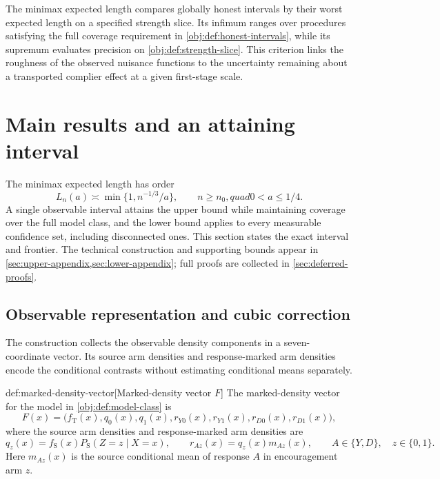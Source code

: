 \documentclass[11pt]{article}
\begin{document}
The minimax expected length  compares globally honest intervals by their worst expected length on a specified strength slice. Its infimum ranges over procedures satisfying the full coverage requirement in \cref{obj:def:honest-intervals}, while its supremum evaluates precision on \cref{obj:def:strength-slice}. This criterion links the roughness of the observed nuisance functions to the uncertainty remaining about a transported complier effect at a given first-stage scale.


\section{Main results and an attaining interval}
\label{sec:main-results}

The minimax expected length has order
\[
L_n(a)\asymp \min\{1,n^{-1/3}/a\},
\qquad n\ge n_0,quad 0<a\le 1/4.
\]
A single observable interval attains the upper bound while maintaining coverage over the full model class, and the lower bound applies to every measurable confidence set, including disconnected ones. This section states the exact interval and frontier. The technical construction and supporting bounds appear in \cref{sec:upper-appendix,sec:lower-appendix}; full proofs are collected in \cref{sec:deferred-proofs}.

\subsection{Observable representation and cubic correction}

The construction collects the observable density components in a seven-coordinate vector. Its source arm densities and response-marked arm densities encode the conditional contrasts without estimating conditional means separately.

\begin{definitionv}{def:marked-density-vector}[Marked-density vector \(F\)]
The marked-density vector for the model in \cref{obj:def:model-class} is
\[
F(x)=\bigl(f_{\mathrm T}(x),q_0(x),q_1(x),
r_{Y0}(x),r_{Y1}(x),r_{D0}(x),r_{D1}(x)\bigr),
\]
where the source arm densities and response-marked arm densities are
\[
q_z(x)=f_{\mathrm S}(x)P_{\mathrm S}(Z=z\mid X=x),
\qquad
r_{Az}(x)=q_z(x)m_{Az}(x),
\qquad A\in\{Y,D\},\quad z\in\{0,1\}.
\]
Here \(m_{Az}(x)\) is the source conditional mean of response \(A\) in encouragement arm \(z\).
\end{definitionv}
\end{document}
